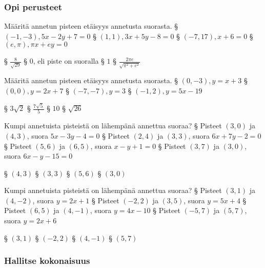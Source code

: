 \begin{tehtavasivu}

\subsubsection*{Opi perusteet}

\begin{tehtava} %
Määritä annetun pisteen etäisyys annetusta suorasta.
\alakohdat
§ $(-1,-3),5x-2y+7 = 0 $
§ $(1,1),3x+5y-8 = 0 $
§ $(-7,17), x + 6 = 0$
§ $(e,\pi),\pi x+ e y = 0$
\loppu
\begin{vastaus}
\alakohdat
§ $\frac{8}{\sqrt{29}}$
§ $0$, eli piste on suoralla
§ $1$
§ $\frac{2\pi e}{\sqrt{\pi^2+e^2}}$
\loppu
\end{vastaus}
\end{tehtava}

\begin{tehtava}
Määritä annetun pisteen etäisyys annetusta suorasta.
\alakohdat
§ $(0,-3),y = x+3$
§ $(0,0),y = 2x+7$
§ $(-7,-7), y = 3$
§ $(-1,2), y = 5x-19$
\loppu
\begin{vastaus}
\alakohdat
§ $3\sqrt{2}$
§ $\frac{7\sqrt{5}}{5}$
§ $10$
§ $\sqrt{26}$
\loppu
\end{vastaus}
\end{tehtava}

\begin{tehtava}
Kumpi annetuista pisteistä on lähempänä annettua suoraa?
\alakohdat
§ Pisteet $(3,0)$ ja $(4,3)$, suora $5x-3y-4=0$
§ Pisteet $(2,4)$ ja $(3,3)$, suora $6x+7y-2=0$
§ Pisteet $(5,6)$ ja $(6,5)$, suora $x-y+1=0$
§ Pisteet $(3,7)$ ja $(3,0)$, suora $6x-y-15=0$
\loppu
\begin{vastaus}
\alakohdat
§ $(4,3)$
§ $(3,3)$
§ $(5,6)$
§ $(3,0)$
\loppu
\end{vastaus}
\end{tehtava}

\begin{tehtava}
Kumpi annetuista pisteistä on lähempänä annettua suoraa?
\alakohdat
§ Pisteet $(3,1)$ ja $(4,-2)$, suora $y=2x+1$
§ Pisteet $(-2,2)$ ja $(3,5)$, suora $y=5x+4$
§ Pisteet $(6,5)$ ja $(4,-1)$, suora $y=4x-10$
§ Pisteet $(-5,7)$ ja $(5,7)$, suora $y=2x+6$
\loppu
\begin{vastaus}
\alakohdat
§ $(3,1)$
§ $(-2,2)$
§ $(4,-1)$
§ $(5,7)$
\loppu
\end{vastaus}
\end{tehtava}

\subsubsection*{Hallitse kokonaisuus}


\end{tehtavasivu}
